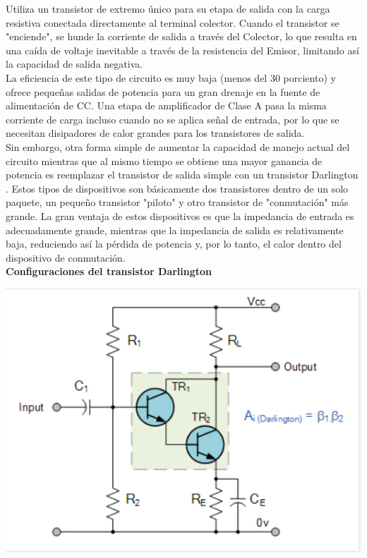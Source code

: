 \documentclass[10pt,a4paper]{article}
\begin{document}
Utiliza un transistor de extremo único para su etapa de salida con la carga resistiva conectada directamente al terminal colector. Cuando el transistor se "enciende", se hunde la corriente de salida a través del Colector, lo que resulta en una caída de voltaje inevitable a través de la resistencia del Emisor, limitando así la capacidad de salida negativa.\\
La eficiencia de este tipo de circuito es muy baja (menos del 30 porciento) y ofrece pequeñas salidas de potencia para un gran drenaje en la fuente de alimentación de CC. Una etapa de amplificador de Clase A pasa la misma corriente de carga incluso cuando no se aplica señal de entrada, por lo que se necesitan disipadores de calor grandes para los transistores de salida.\\
Sin embargo, otra forma simple de aumentar la capacidad de manejo actual del circuito mientras que al mismo tiempo se obtiene una mayor ganancia de potencia es reemplazar el transistor de salida simple con un transistor Darlington . Estos tipos de dispositivos son básicamente dos transistores dentro de un solo paquete, un pequeño transistor "piloto" y otro transistor de "conmutación" más grande. La gran ventaja de estos dispositivos es que la impedancia de entrada es adecuadamente grande, mientras que la impedancia de salida es relativamente baja, reduciendo así la pérdida de potencia y, por lo tanto, el calor dentro del dispositivo de conmutación.\\
\textbf{Configuraciones del transistor Darlington}\\
\begin{center}
\includegraphics[scale=0.4]{img3.png} 
\end{center}
\end{document}
